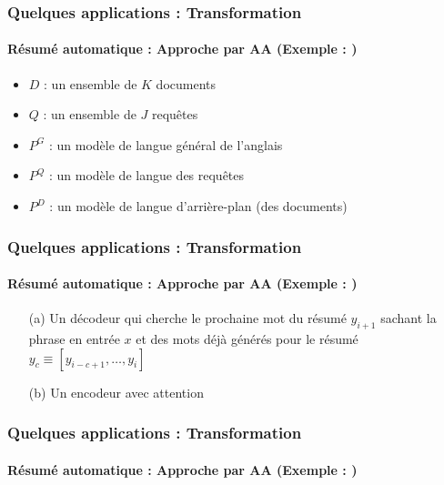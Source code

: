 \documentclass[xcolor=table]{beamer}
\begin{document}
\begin{frame}
	\frametitle{Quelques applications : Transformation}
	\framesubtitle{Résumé automatique : Approche par AA (Exemple : \cite{06-daumeiii-marcu})}
	
	\begin{minipage}{.6\textwidth}
		\begin{itemize}
			\item $D$ : un ensemble de $K$ documents
			\item $Q$ : un ensemble de $J$ requêtes
			\item $P^G$ : un modèle de langue général de l'anglais 
			\item $P^Q$ : un modèle de langue des requêtes
			\item $P^D$ : un modèle de langue d'arrière-plan (des documents)
		\end{itemize}
	\end{minipage}
	\begin{minipage}{.38\textwidth}
	\end{minipage}
	
\end{frame}

\begin{frame}
	\frametitle{Quelques applications : Transformation}
	\framesubtitle{Résumé automatique : Approche par AA (Exemple : \cite{15-rush-al})}
	
	\begin{center}
	\end{center}
	
	\begin{itemize}
		\item[(a)] Un décodeur qui cherche le prochaine mot du résumé $y_{i+1}$ sachant la phrase en entrée $x$ et des mots déjà générés pour le résumé $y_c \equiv [y_{i-c+1},\ldots, y_i]$
		\item[(b)] Un encodeur avec attention
	\end{itemize}
	
\end{frame}

\begin{frame}
	\frametitle{Quelques applications : Transformation}
	\framesubtitle{Résumé automatique : Approche par AA (Exemple : \cite{18-narayan-al})}
	
	
\end{frame}
\end{document}
